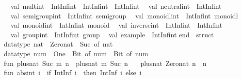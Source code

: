 \begin{isabellebody}
\begin{isamarkuptext}
\ \ val\ mult{}int\ {}\ IntInf{}int\ {}{}\ IntInf{}int\ {}{}\ IntInf{}int\isanewline
\ \ val\ neutral{}int\ {}\ IntInf{}int\isanewline
\ \ val\ semigroup{}int\ {}\ IntInf{}int\ semigroup\isanewline
\ \ val\ monoidl{}int\ {}\ IntInf{}int\ monoidl\isanewline
\ \ val\ monoid{}int\ {}\ IntInf{}int\ monoid\isanewline
\ \ val\ inverse{}int\ {}\ IntInf{}int\ {}{}\ IntInf{}int\isanewline
\ \ val\ group{}int\ {}\ IntInf{}int\ group\isanewline
\ \ val\ example\ {}\ IntInf{}int\isanewline
end\ {}\ struct\isanewline
\isanewline
datatype\ nat\ {}\ Zero{}nat\ {}\ Suc\ of\ nat{}\isanewline
\isanewline
datatype\ num\ {}\ One\ {}\ Bit{}\ of\ num\ {}\ Bit{}\ of\ num{}\isanewline
\isanewline
fun\ plus{}nat\ {}Suc\ m{}\ n\ {}\ plus{}nat\ m\ {}Suc\ n{}\isanewline
\ \ {}\ plus{}nat\ Zero{}nat\ n\ {}\ n{}\isanewline
\isanewline
fun\ abs{}int\ i\ {}\ {}if\ IntInf{}{}\ {}i{}\ {}{}\ then\ IntInf{}{}\ i\ else\ i{}{}\isanewline

\end{isamarkuptext}
\end{isabellebody}
